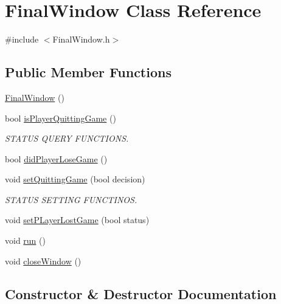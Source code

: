 \hypertarget{class_final_window}{}\section{Final\+Window Class Reference}
\label{class_final_window}


{\ttfamily \#include $<$Final\+Window.\+h$>$}

\subsection*{Public Member Functions}
\begin{DoxyCompactItemize}
\item 
\hyperlink{class_final_window_a2ccf640840c119591a2c84fcc9956ccd}{Final\+Window} ()
\item 
bool \hyperlink{class_final_window_aa719a7ffb084df7f00a72fdb0d843c38}{is\+Player\+Quitting\+Game} ()
\begin{DoxyCompactList}\small\item\em S\+T\+A\+T\+US Q\+U\+E\+RY F\+U\+N\+C\+T\+I\+O\+NS. \end{DoxyCompactList}\item 
bool \hyperlink{class_final_window_a793b0fa86eac2eef3256d9d2f1f3711b}{did\+Player\+Lose\+Game} ()
\item 
void \hyperlink{class_final_window_afd73d524fd2f10486d86a2e0057fcb54}{set\+Quitting\+Game} (bool decision)
\begin{DoxyCompactList}\small\item\em S\+T\+A\+T\+US S\+E\+T\+T\+I\+NG F\+U\+N\+C\+T\+I\+N\+OS. \end{DoxyCompactList}\item 
void \hyperlink{class_final_window_a3ad8ebeede5375c9cd4732e794f076ac}{set\+P\+Layer\+Lost\+Game} (bool status)
\item 
void \hyperlink{class_final_window_ad0ff2789d7ab310a4b70e393f602deff}{run} ()
\item 
void \hyperlink{class_final_window_a3c5b82cb988e1f312c0f459959442e2b}{close\+Window} ()
\end{DoxyCompactItemize}


\subsection{Constructor \& Destructor Documentation}
\mbox{\label{class_final_window_a2ccf640840c119591a2c84fcc9956ccd}} 
